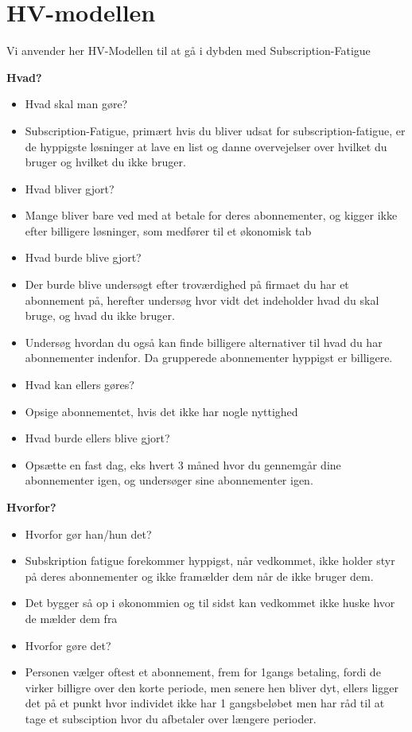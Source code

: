 \section{HV-modellen}
\label{apx:hv-modellen}
Vi anvender her HV-Modellen til at gå i dybden med Subscription-Fatigue 

\textbf{Hvad?} 

\begin{itemize}
\item Hvad skal man gøre? 
\item Subscription-Fatigue, primært hvis du bliver udsat for subscription-fatigue, er de hyppigste løsninger at lave en list og danne overvejelser over hvilket du bruger og hvilket du ikke bruger. 
\item Hvad bliver gjort? 
\item Mange bliver bare ved med at betale for deres abonnementer, og kigger ikke efter billigere løsninger, som medfører til et økonomisk tab 
\item Hvad burde blive gjort? 
\item Der burde blive undersøgt efter troværdighed på firmaet du har et abonnement på, herefter undersøg hvor vidt det indeholder hvad du skal bruge, og hvad du ikke bruger. 
\item Undersøg hvordan du også kan finde billigere alternativer til hvad du har abonnementer indenfor. Da grupperede abonnementer hyppigst er billigere. 
\item Hvad kan ellers gøres? 
\item Opsige abonnementet, hvis det ikke har nogle nyttighed 
\item Hvad burde ellers blive gjort? 
\item Opsætte en fast dag, eks hvert 3 måned hvor du gennemgår dine abonnementer igen, og undersøger sine abonnementer igen. 
\end{itemize}

\textbf{Hvorfor?}
\begin{itemize}
    \item Hvorfor gør han/hun det? 
    \item Subskription fatigue forekommer hyppigst, når vedkommet, ikke holder styr på deres abonnementer og ikke framælder dem når de ikke bruger dem. 
    \item Det bygger så op i økonommien og til sidst kan vedkommet ikke huske hvor de mælder dem fra 
    \item Hvorfor gøre det?     
    \item Personen vælger oftest et abonnement, frem for 1gangs betaling, fordi de virker billigre over den korte periode, men senere hen bliver dyt, ellers ligger det på et punkt hvor individet ikke har 1 gangsbeløbet men har råd til at tage et subsciption hvor du afbetaler over længere perioder. 
\end{itemize}
    
